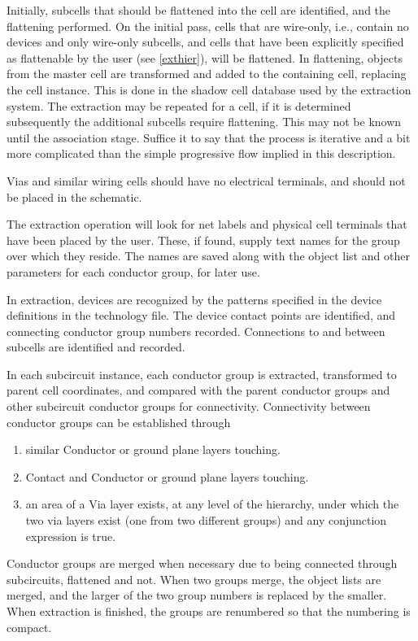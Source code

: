 Initially, subcells that should be flattened into the cell are
identified, and the flattening performed.  On the initial pass, cells
that are wire-only, i.e., contain no devices and only wire-only
subcells, and cells that have been explicitly specified as flattenable
by the user (see \ref{exthier}), will be flattened.  In flattening,
objects from the master cell are transformed and added to the
containing cell, replacing the cell instance.  This is done in the
shadow cell database used by the extraction system.  The extraction
may be repeated for a cell, if it is determined subsequently the
additional subcells require flattening.  This may not be known until
the association stage.  Suffice it to say that the process is
iterative and a bit more complicated than the simple progressive flow
implied in this description.

Vias and similar wiring cells should have no electrical terminals,
and should not be placed in the schematic.

The extraction operation will look for net labels and physical cell
terminals that have been placed by the user.  These, if found, supply
text names for the group over which they reside.  The names are saved
along with the object list and other parameters for each conductor
group, for later use.

In extraction, devices are recognized by the patterns specified in the
device definitions in the technology file.  The device contact points
are identified, and connecting conductor group numbers recorded. 
Connections to and between subcells are identified and recorded.

In each subcircuit instance, each conductor group is extracted,
transformed to parent cell coordinates, and compared with the parent
conductor groups and other subcircuit conductor groups for
connectivity.  Connectivity between conductor groups can be
established through
\begin{enumerate}
\item{similar {\vt Conductor} or ground plane layers touching.}
\item{{\vt Contact} and {\vt Conductor} or ground plane layers
touching.}
\item{an area of a {\vt Via} layer exists, at any level of the
hierarchy, under which the two via layers exist (one from two
different groups) and any conjunction expression is true.}
\end{enumerate}

Conductor groups are merged when necessary due to being connected
through subcircuits, flattened and not.  When two groups merge, the
object lists are merged, and the larger of the two group numbers is
replaced by the smaller.  When extraction is finished, the groups are
renumbered so that the numbering is compact.


